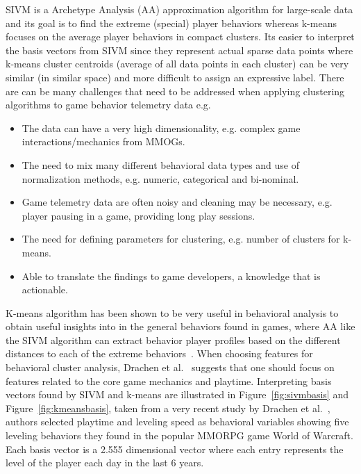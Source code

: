 SIVM is a Archetype Analysis (AA) approximation algorithm for large-scale data and its goal is to find the extreme (special) player behaviors whereas k-means focuses on the average player behaviors in compact clusters. Its easier to interpret the basis vectors from SIVM since they represent actual sparse data points where k-means cluster centroids (average of all data points in each cluster) can be very similar (in similar space) and more difficult to assign an expressive label. There are can be many challenges that need to be addressed when applying clustering algorithms to game behavior telemetry data e.g.
\begin{itemize}
\item The data can have a very high dimensionality, e.g. complex game interactions/mechanics from MMOGs.
\item The need to mix many different behavioral data types and use of normalization methods, e.g. numeric, categorical and bi-nominal.
\item Game telemetry data are often noisy and cleaning may be necessary, e.g. player pausing in a game, providing long play sessions.
\item The need for defining parameters for clustering, e.g. number of clusters for k-means.
\item Able to translate the findings to game developers, a knowledge that is actionable.
\end{itemize}

K-means algorithm has been shown to be very useful in behavioral analysis to obtain useful insights into in the general behaviors found in games, where AA like the SIVM algorithm can extract behavior player profiles based on the different distances to each of the extreme behaviors~\citep{Drachen:2013}. When choosing features for behavioral cluster analysis, Drachen et al.~\citep{Drachen:2009TGA, Drachen:2012} suggests that one should focus on features related to the core game mechanics and playtime. Interpreting basis vectors found by SIVM and k-means are illustrated in Figure~\ref{fig:sivmbasis} and Figure~\ref{fig:kmeansbasis}, taken from a very recent study by Drachen et al.~\citep{Drachen:2013}, authors selected playtime and leveling speed as behavioral variables showing five leveling behaviors they found in the popular MMORPG game World of Warcraft. Each basis vector is a 2.555 dimensional vector where each entry represents the level of the player each day in the last 6 years.\\


